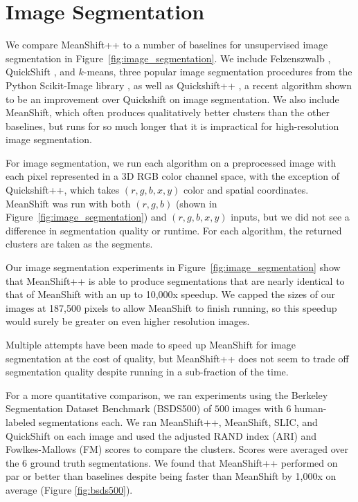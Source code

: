 \section{Image Segmentation}

We compare MeanShift++ to a number of baselines for unsupervised image segmentation in Figure~\ref{fig:image_segmentation}. We include Felzenszwalb \cite{felzenszwalb2004efficient}, QuickShift \cite{vedaldi2008quick}, and $k$-means, three popular image segmentation procedures from the Python Scikit-Image library \cite{van2014scikit}, as well as Quickshift++ \cite{jiang2018quickshift++}, a recent algorithm shown to be an improvement over Quickshift on image segmentation. We also include MeanShift, which often produces qualitatively better clusters than the other baselines, but runs for so much longer that it is impractical for high-resolution image segmentation. 

For image segmentation, we run each algorithm on a preprocessed image with each pixel represented in a 3D RGB color channel space, with the exception of Quickshift++, which takes $(r, g, b, x, y)$ color and spatial coordinates. MeanShift was run with both $(r, g, b)$ (shown in Figure~\ref{fig:image_segmentation}) and $(r, g, b, x, y)$ inputs, but we did not see a difference in segmentation quality or runtime. For each algorithm, the returned clusters are taken as the segments.

Our image segmentation experiments in Figure~\ref{fig:image_segmentation} show that MeanShift++ is able to produce segmentations that are nearly identical to that of MeanShift with an up to 10,000x speedup. We capped the sizes of our images at 187,500 pixels to allow MeanShift to finish running, so this speedup would surely be greater on even higher resolution images. 

Multiple attempts have been made to speed up MeanShift for image segmentation at the cost of quality, but MeanShift++ does not seem to trade off segmentation quality despite running in a sub-fraction of the time.

For a more quantitative comparison, we ran experiments using the Berkeley Segmentation Dataset Benchmark (BSDS500) of $500$ images with $6$ human-labeled segmentations each. We ran MeanShift++, MeanShift, SLIC, and QuickShift on each image and used the adjusted RAND index \cite{hubert1985comparing} (ARI) and Fowlkes-Mallows \cite{fowlkes1983method} (FM) scores to compare the clusters. Scores were averaged over the $6$ ground truth segmentations. We found that MeanShift++ performed on par or better than baselines despite being faster than MeanShift by 1,000x on average (Figure \ref{fig:bsds500}). \\